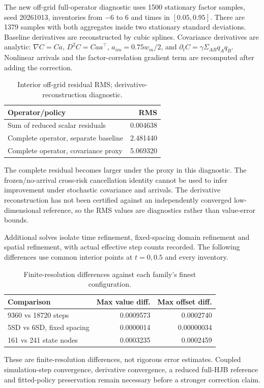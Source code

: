 The new off-grid full-operator diagnostic uses 1500 stationary factor samples, seed 20261013, inventories from $-6$ to $6$ and times in $[0.05,0.95]$. There are 1379 samples with both aggregates inside two stationary standard deviations. Baseline derivatives are reconstructed by cubic splines. Covariance derivatives are analytic: $\nabla C=Ca$, $D^2C=Caa^\top$, $a_{im}=0.75w_m/2$, and $\partial_t C=\gamma\Sigma_{AB}q_Aq_B$. Nonlinear arrivals and the factor-correlation gradient term are recomputed after adding the correction.

\begin{table}[ht]\centering
\caption{Interior off-grid residual RMS; derivative-reconstruction diagnostic.}
\begin{tabular}{lr}\toprule
Operator/policy & RMS\\\midrule
Sum of reduced scalar residuals & 0.004638\\
Complete operator, separate baseline & 2.481440\\
Complete operator, covariance proxy & 5.069320\\\bottomrule
\end{tabular}\end{table}
The complete residual becomes larger under the proxy in this diagnostic. The frozen/no-arrival cross-risk cancellation identity cannot be used to infer improvement under stochastic covariance and arrivals. The derivative reconstruction has not been certified against an independently converged low-dimensional reference, so the RMS values are diagnostics rather than value-error bounds.

Additional solves isolate time refinement, fixed-spacing domain refinement and spatial refinement, with actual effective step counts recorded. The following differences use common interior points at $t=0,0.5$ and every inventory.
\begin{table}[ht]\centering\small
\caption{Finite-resolution differences against each family's finest configuration.}
\begin{tabular}{lrr}\toprule
Comparison & Max value diff. & Max offset diff.\\\midrule
9360 vs 18720 steps & 0.0009573 & 0.0002740\\
5SD vs 6SD, fixed spacing & 0.0000014 & 0.00000034\\
161 vs 241 state nodes & 0.0003235 & 0.0002459\\\bottomrule
\end{tabular}\end{table}
These are finite-resolution differences, not rigorous error estimates. Coupled simulation-step convergence, derivative convergence, a reduced full-HJB reference and fitted-policy preservation remain necessary before a stronger correction claim.

